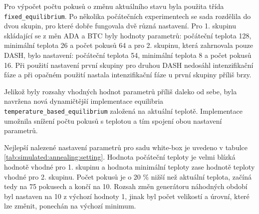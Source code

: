 Pro výpočet počtu pokusů o změnu aktuálního stavu byla použita třída \texttt{fixed\_equilibrium}.
Po několika počátečních experimentech se sada rozdělila do dvou skupin, pro které dobře fungovala dvě různá nastavení.
Pro 1. skupinu skládající se z měn ADA a BTC byly hodnoty parametrů: počáteční teplota 128, minimální teplota 26 a počet pokusů 64 a pro 2. skupinu, která zahrnovala pouze DASH, bylo nastavení: počáteční teplota 54, minimální teplota 8 a počet pokusů 16.
Při použití nastavení první skupiny pro druhou DASH nedosáhl intenzifikační fáze a při opačném použití nastala intenzifikační fáze u první skupiny příliš brzy.

Jelikož byly rozsahy vhodných hodnot parametrů příliš daleko od sebe, byla navržena nová dynamičtější implementace equilibria  \texttt{temperature\_based\_equilibrium} založená na aktuální teplotě.
Implementace umožnila snížení počtu pokusů s teplotou a tím spojení obou nastavení parametrů.

Nejlepší nalezené nastavení parametrů pro sadu white-box je uvedeno v tabulce \ref{tab:simulated:annealing:setting}.
Hodnota počáteční teploty je velmi blízká hodnotě vhodné pro 1. skupinu a hodnota minimální teploty zase hodnotě teploty vhodné pro 2. skupinu.
Počet pokusů je o 20 \% nižší než aktuální teplota, začíná tedy na 75 pokusech a končí na 10.
Rozsah změn generátoru náhodných období byl nastaven na 10 z výchozí hodnoty 1, jinak byl počet velikostí a úrovní, které lze změnit, ponechán na výchozí minimum.

